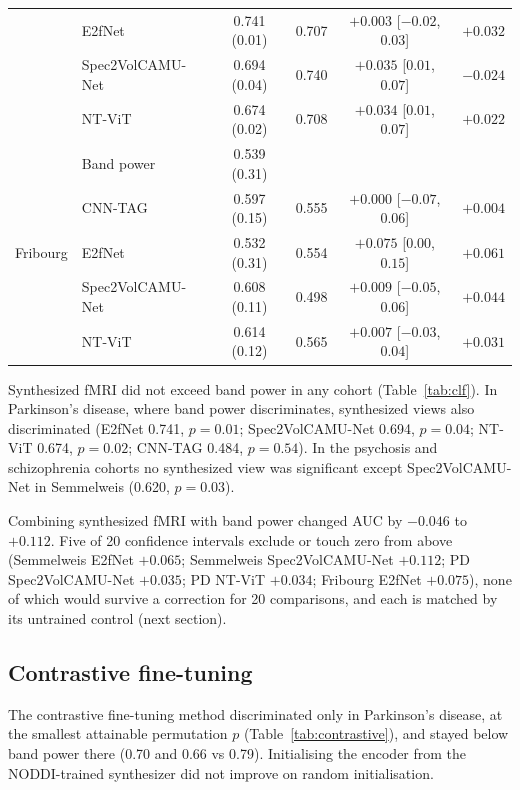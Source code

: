 \documentclass[11pt]{article}
\begin{document}
\begin{table}[t]
\begin{tabular}{llcccc}
 & E2fNet & 0.741 (0.01) & 0.707 & $+0.003$ [$-0.02$, $0.03$] & $+0.032$ \\
 & Spec2VolCAMU-Net & 0.694 (0.04) & 0.740 & $+0.035$ [$0.01$, $0.07$] & $-0.024$ \\
 & NT-ViT & 0.674 (0.02) & 0.708 & $+0.034$ [$0.01$, $0.07$] & $+0.022$ \\
\midrule
\multirow{5}{*}{Fribourg} & Band power & 0.539 (0.31) & & & \\
 & CNN-TAG & 0.597 (0.15) & 0.555 & $+0.000$ [$-0.07$, $0.06$] & $+0.004$ \\
 & E2fNet & 0.532 (0.31) & 0.554 & $+0.075$ [$0.00$, $0.15$] & $+0.061$ \\
 & Spec2VolCAMU-Net & 0.608 (0.11) & 0.498 & $+0.009$ [$-0.05$, $0.06$] & $+0.044$ \\
 & NT-ViT & 0.614 (0.12) & 0.565 & $+0.007$ [$-0.03$, $0.04$] & $+0.031$ \\
\bottomrule
\end{tabular}
\end{table}

Synthesized fMRI did not exceed band power in any cohort (Table~\ref{tab:clf}).
In Parkinson's disease, where band power discriminates, synthesized views also discriminated (E2fNet 0.741, $p=0.01$; Spec2VolCAMU-Net 0.694, $p=0.04$; NT-ViT 0.674, $p=0.02$; CNN-TAG 0.484, $p=0.54$).
In the psychosis and schizophrenia cohorts no synthesized view was significant except Spec2VolCAMU-Net in Semmelweis (0.620, $p=0.03$).

Combining synthesized fMRI with band power changed AUC by $-0.046$ to $+0.112$.
Five of 20 confidence intervals exclude or touch zero from above (Semmelweis E2fNet $+0.065$; Semmelweis Spec2VolCAMU-Net $+0.112$; PD Spec2VolCAMU-Net $+0.035$; PD NT-ViT $+0.034$; Fribourg E2fNet $+0.075$), none of which would survive a correction for 20 comparisons, and each is matched by its untrained control (next section).

\subsection{Contrastive fine-tuning}\label{sec:res_contrastive}
The contrastive fine-tuning method discriminated only in Parkinson's disease, at the smallest attainable permutation $p$ (Table~\ref{tab:contrastive}), and stayed below band power there (0.70 and 0.66 vs 0.79).
Initialising the encoder from the NODDI-trained synthesizer did not improve on random initialisation.
\end{document}
